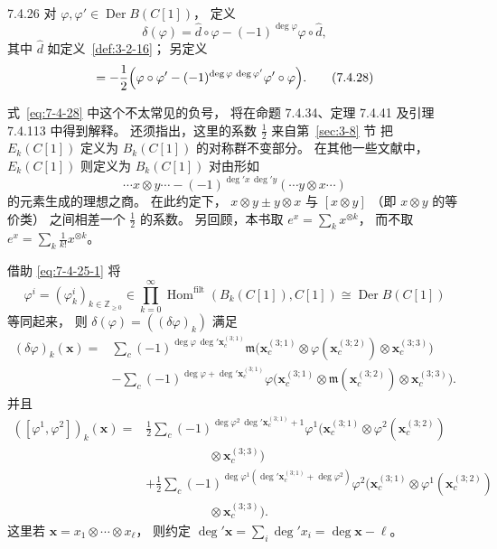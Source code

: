
\begin{definition}{7.4.26}\label{def:7-4-26}
对
$\varphi,\varphi'\in
\operatorname{Der}B(C[1])$，
定义
\begin{equation}
\delta(\varphi)
=\widehat d\circ\varphi
-(-1)^{\deg\varphi}
\varphi\circ\widehat d,
\tag{7.4.27}\label{eq:7-4-27}
\end{equation}
其中 $\widehat d$ 如定义~\ref{def:3-2-16}；
另定义
\begin{equation}
[\varphi,\varphi']
=-\frac12\Bigl(
\varphi\circ\varphi'
-(-1)^{\deg\varphi\,\deg\varphi'}
\varphi'\circ\varphi\Bigr).
\tag{7.4.28}\label{eq:7-4-28}
\end{equation}
\end{definition}

式~\eqref{eq:7-4-28}
中这个不太常见的负号，
将在命题 7.4.34、定理 7.4.41
及引理 7.4.113 中得到解释。
还须指出，这里的系数 $\frac12$
来自第~\ref{sec:3-8} 节
把 $E_k(C[1])$ 定义为
$B_k(C[1])$ 的对称群不变部分。
在其他一些文献中，
$E_k(C[1])$ 则定义为
$B_k(C[1])$ 对由形如
\[
\cdots x\otimes y\cdots
-(-1)^{\deg' x\,\deg' y}
(\cdots y\otimes x\cdots)
\]
的元素生成的理想之商。
在此约定下，
$x\otimes y\pm y\otimes x$
与 $[x\otimes y]$
（即 $x\otimes y$ 的等价类）
之间相差一个 $\frac12$ 的系数。
另回顾，本书取
$e^x=\sum_k x^{\otimes k}$，
而不取
$e^x=\sum_k \frac1{k!}x^{\otimes k}$。

借助
\eqref{eq:7-4-25-1}
将
\[
\varphi^i=(\varphi_k^i)_{k\in\mathbb Z_{\ge0}}
\in\prod_{k=0}^{\infty}
\operatorname{Hom}^{\mathrm{filt}}
(B_k(C[1]),C[1])
\cong\operatorname{Der}B(C[1])
\]
等同起来，
则 $\delta(\varphi)
=((\delta\varphi)_k)$ 满足
\begin{equation}
\begin{aligned}
(\delta\varphi)_k(\mathbf x)
={}&\sum_c
(-1)^{\deg\varphi\,\deg'\mathbf x_c^{(3;1)}}
\mathfrak m\bigl(
\mathbf x_c^{(3;1)}\otimes
\varphi(\mathbf x_c^{(3;2)})\otimes
\mathbf x_c^{(3;3)}\bigr)\\
&-\sum_c
(-1)^{\deg\varphi+
\deg'\mathbf x_c^{(3;1)}}
\varphi\bigl(
\mathbf x_c^{(3;1)}\otimes
\mathfrak m(\mathbf x_c^{(3;2)})\otimes
\mathbf x_c^{(3;3)}\bigr).
\end{aligned}
\tag{7.4.27$'$}\label{eq:7-4-27-prime}
\end{equation}
并且
\begin{equation}
\begin{aligned}
([\varphi^1,\varphi^2])_k(\mathbf x)
={}&\frac12\sum_c
(-1)^{\deg\varphi^2\,\deg'\mathbf x_c^{(3;1)}+1}
\varphi^1\bigl(
\mathbf x_c^{(3;1)}\otimes
\varphi^2(\mathbf x_c^{(3;2)})\\
&\hspace{5em}\otimes
\mathbf x_c^{(3;3)}\bigr)\\
&+\frac12\sum_c
(-1)^{\deg\varphi^1
(\deg'\mathbf x_c^{(3;1)}
+\deg\varphi^2)}
\varphi^2\bigl(
\mathbf x_c^{(3;1)}\otimes
\varphi^1(\mathbf x_c^{(3;2)})\\
&\hspace{5em}\otimes
\mathbf x_c^{(3;3)}\bigr).
\end{aligned}
\tag{7.4.28$'$}\label{eq:7-4-28-prime}
\end{equation}
这里若
$\mathbf x=x_1\otimes\cdots\otimes x_\ell$，
则约定
$\deg'\mathbf x
=\sum_i\deg' x_i
=\deg\mathbf x-\ell$。

